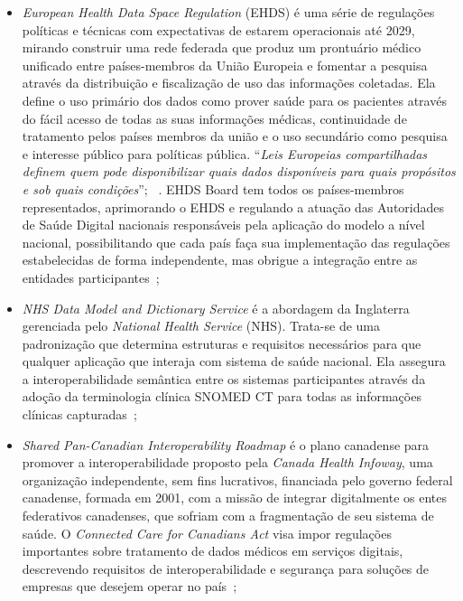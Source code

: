 \begin{itemize}
  \item \textit{European Health Data Space Regulation} (EHDS) é uma série de regulações políticas e técnicas com expectativas de estarem operacionais até 2029, mirando construir uma rede federada que produz um prontuário médico unificado entre países-membros da União Europeia e fomentar a pesquisa através da distribuição e fiscalização de uso das informações coletadas. Ela define o uso primário dos dados como prover saúde para os pacientes através do fácil acesso de todas as suas informações médicas, continuidade de tratamento pelos países membros da união e o uso secundário como pesquisa e interesse público para políticas pública. ``\textit{Leis Europeias compartilhadas definem quem pode disponibilizar quais dados disponíveis para quais propósitos e sob quais condições}''; ~\cite{EHDS_Implementation_and_governance}. EHDS Board tem todos os países-membros representados, aprimorando o EHDS e regulando a atuação das Autoridades de Saúde Digital nacionais responsáveis pela aplicação do modelo a nível nacional, possibilitando que cada país faça sua implementação das regulações estabelecidas de forma independente, mas obrigue a integração entre as entidades participantes~\cite{EHDS, InsidePrivacy-EHDS-Governance, EHDS-Regulation};
  \item \textit{NHS Data Model and Dictionary Service} é a abordagem da Inglaterra gerenciada pelo \textit{National Health Service} (NHS). Trata-se de uma padronização que determina estruturas e requisitos necessários para que qualquer aplicação que interaja com sistema de saúde nacional. Ela assegura a interoperabilidade semântica entre os sistemas participantes através da adoção da terminologia clínica SNOMED CT para todas as informações clínicas capturadas~\cite{NHS, NHS-Digital-SNOMEDCT, NHS-Digital-DataModel,SNOMEDCT,SNOMEDCTOverview};
  \item \textit{Shared Pan-Canadian Interoperability Roadmap} é o plano canadense para promover a interoperabilidade proposto pela \textit{Canada Health Infoway}, uma organização independente, sem fins lucrativos, financiada pelo governo federal canadense, formada em 2001, com a missão de integrar digitalmente os entes federativos canadenses, que sofriam com a fragmentação de seu sistema de saúde. O \textit{Connected Care for Canadians Act} visa impor regulações importantes sobre tratamento de dados médicos em serviços digitais, descrevendo requisitos de interoperabilidade e segurança para soluções de empresas que desejem operar no país~\cite{SharedPan-CanadianInteroperability,ConnectedCareAct,CanadaHealthInfoway};

\end{itemize}
